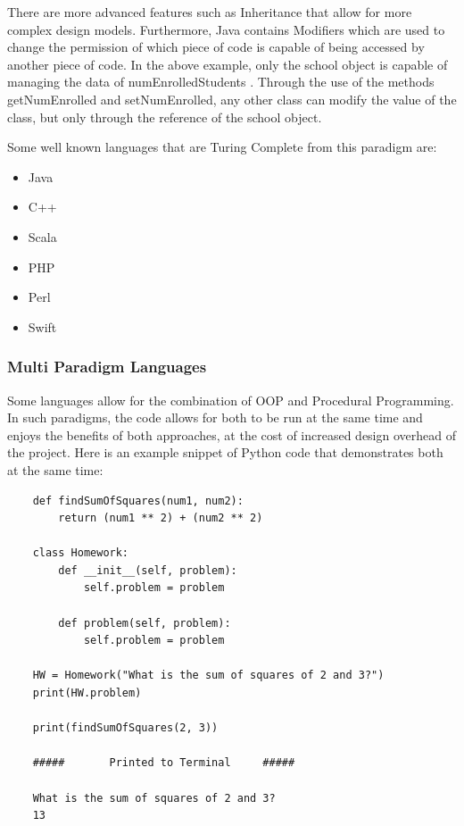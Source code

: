 There are more advanced features such as Inheritance that allow for more complex design models.
Furthermore, Java contains Modifiers which are used to change the permission of which piece of code is capable of being accessed by another piece of code.
In the above example, only the school object is capable of managing the data of numEnrolledStudents \cite{CSUNStudents}.
Through the use of the methods getNumEnrolled and setNumEnrolled, any other class can modify the value of the class, but only through the reference of the school object.

Some well known languages that are Turing Complete from this paradigm are: 
\begin{itemize}
    \item Java
    \item C++
    \item Scala
    \item PHP
    \item Perl
    \item Swift        
\end{itemize}


\subsubsection{Multi Paradigm Languages}\label{subsubsec:MultiParadigmPL}

Some languages allow for the combination of OOP and Procedural Programming.
In such paradigms, the code allows for both to be run at the same time and enjoys the benefits of both approaches, at the cost of increased design overhead of the project.
Here is an example snippet of Python code that demonstrates both at the same time:

\begin{verbatim}
    def findSumOfSquares(num1, num2):
        return (num1 ** 2) + (num2 ** 2)

    class Homework:
        def __init__(self, problem):
            self.problem = problem
            
        def problem(self, problem):
            self.problem = problem

    HW = Homework("What is the sum of squares of 2 and 3?")
    print(HW.problem)

    print(findSumOfSquares(2, 3))

    #####       Printed to Terminal     #####

    What is the sum of squares of 2 and 3?
    13  
    
\end{verbatim}

